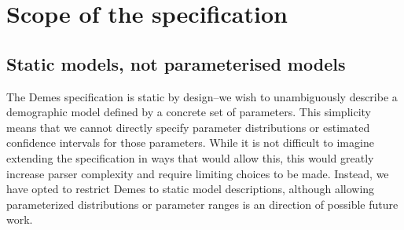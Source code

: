 \documentclass[11pt]{article}
\newcommand{\ggcomment}[1]{{\textcolor{yellow!60!red}{GG: #1}}}
\newcommand{\krtcomment}[1]{{\textcolor{purple}{KRT: #1}}}
\begin{document}
\section{Scope of the specification}
\label{sec:appendix-scope}

\subsection{Static models, not parameterised models}
\label{sec:appendix-static}


The Demes specification is static by design--we wish to
unambiguously describe a demographic model defined by a concrete set
of parameters. This simplicity means that we cannot directly
specify parameter distributions or estimated confidence intervals
for those parameters. While it is not difficult to imagine extending
the specification in ways that would allow this, this would greatly
increase parser complexity and require limiting choices to be made.
Instead, we have opted to restrict Demes to static model descriptions,
although allowing parameterized distributions or parameter ranges 
is an direction of possible future work.


\end{document}
